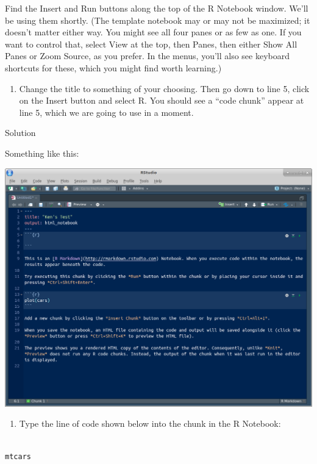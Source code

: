 \documentclass[]{tufte-book}
\providecommand{\tightlist}{%
  \setlength{\itemsep}{0pt}\setlength{\parskip}{0pt}}
\theoremstyle{definition}
\theoremstyle{definition}
\theoremstyle{definition}
\theoremstyle{remark}
\begin{document}
Find the Insert and Run buttons along the top of the R Notebook window.
We'll be using them shortly. (The template notebook may or may not be
maximized; it doesn't matter either way. You might see all four panes or
as few as one. If you want to control that, select View at the top, then
Panes, then either Show All Panes or Zoom Source, as you prefer. In the
menus, you'll also see keyboard shortcuts for these, which you might
find worth learning.)

\begin{enumerate}
\def\labelenumi{(\alph{enumi})}
\setcounter{enumi}{2}
\tightlist
\item
  Change the title to something of your choosing. Then go down to line
  5, click on the Insert button and select R. You should see a ``code
  chunk'' appear at line 5, which we are going to use in a moment.
\end{enumerate}

Solution

Something like this:

\includegraphics{chunk1.png}

\begin{enumerate}
\def\labelenumi{(\alph{enumi})}
\setcounter{enumi}{3}
\tightlist
\item
  Type the line of code shown below into the chunk in the R Notebook:
\end{enumerate}

\begin{verbatim}

mtcars
\end{verbatim}
\end{document}
